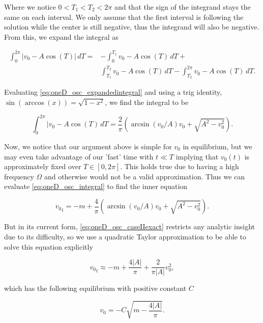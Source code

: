 Where we notice $0<T_1<T_2<2\pi$ and that the sign of the integrand stays the same on each interval. We only assume that the first interval is following the solution while the center is still negative, thus the integrand will also be negative. From this, we expand the integral as

\begin{equation}\label{eq:oneD_osc_expandedintegral}
\begin{aligned}
\int_0^{2\pi}|v_0-A\cos(T)|\,dT=&-\int_0^{T_1}v_0-A\cos(T)\,dT+\\
&\int_{T_1}^{T_2}v_0-A\cos(T)\,dT-\int_{T_2}^{2\pi}v_0-A\cos(T)\,dT.
\end{aligned}
\end{equation}

Evaluating \eqref{eq:oneD_osc_expandedintegral} and using a trig identity, $\sin(\arccos(x))=\sqrt{1-x^2}$, we find the integral to be

\begin{equation*}
\int_0^{2\pi}|v_0-A\cos(T)\,dT=\frac{2}{\pi}\left(\arcsin(v_0/A)v_0+\sqrt{A^2-v_0^2}\right).
\end{equation*}

Now, we notice that our argument above is simple for $v_0$ in equilibrium, but we may even take advantage of our 'fast' time with $t\ll T$ implying that $v_0(t)$ is approximately fixed over $T\in [0,2\pi]$. This holds true due to having a high frequency $\Omega$ and otherwise would not be a valid approximation. Thus we can evaluate \eqref{eq:oneD_osc_integral} to find the inner equation 

\begin{equation}\label{eq:oneD_osc_caseIIexact}
{v_0}_t=-m+\frac{4}{\pi}\left(\arcsin(v_0/A)v_0+\sqrt{A^2-v_0^2}\right).
\end{equation}

But in its current form, \eqref{eq:oneD_osc_caseIIexact} restricts any analytic insight due to its difficulty, so we use a quadratic Taylor approximation to be able to solve this equation explicitly

\begin{equation}\label{eq:oneD_osc_caseIItaylor}
{v_0}_t \approx -m + \frac{4|A|}{\pi} + \frac{2}{\pi |A|}v_0^2,
\end{equation}

which has the following equilibrium with positive constant $C$

\begin{equation}\label{eq:oneD_osc_caseIIequil}
v_0=-C\sqrt{m-\frac{4|A|}{\pi}}.
\end{equation}

